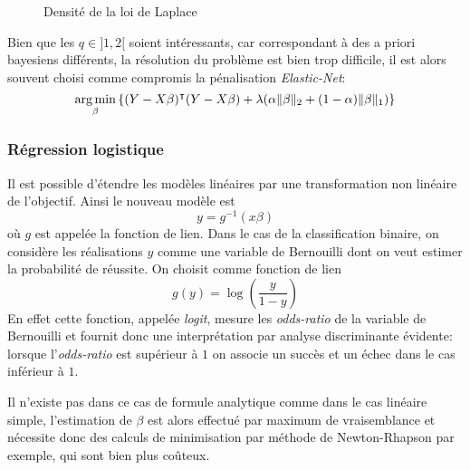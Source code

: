 \begin{figure}[htbp]
    \centering
    \caption{Densité de la loi de Laplace}\label{fig:laplace}
\end{figure}

Bien que les $q \in ]1,2[$ soient intéressants, car correspondant à des a priori bayesiens différents, la résolution du problème est bien trop difficile, il est alors souvent choisi comme compromis la pénalisation \emph{Elastic-Net}:
\begin{equation*}
    \operatorname*{arg\,min}_\beta \left\{ (Y - X \beta)^\intercal ( Y - X \beta ) + \lambda ( \alpha \Vert \beta \Vert_2 + (1-\alpha) \Vert \beta \Vert_1 )  \right\}
\end{equation*}

\subsubsection{Régression logistique}

Il est possible d'étendre les modèles linéaires par une transformation non linéaire de l'objectif. Ainsi le nouveau modèle est
\begin{equation*}
    y = g^{-1} ( x \beta )
\end{equation*}
où $g$ est appelée la fonction de lien. Dans le cas de la classification binaire, on considère les réalisations $y$ comme une variable de Bernouilli dont on veut estimer la probabilité de réussite. On choisit comme fonction de lien
\begin{equation*}
    g(y) = \log \left( \frac{y}{1-y} \right)
\end{equation*}
En effet cette fonction, appelée \emph{logit}, mesure les \emph{odds-ratio} de la variable de Bernouilli et fournit donc une interprétation par analyse discriminante évidente: lorsque l'\emph{odds-ratio} est supérieur à $1$ on associe un succès et un échec dans le cas inférieur à $1$.

Il n'existe pas dans ce cas de formule analytique comme dans le cas linéaire simple, l'estimation de $\beta$ est alors effectué par maximum de vraisemblance et nécessite donc des calculs de minimisation par méthode de Newton-Rhapson par exemple, qui sont bien plus coûteux.

